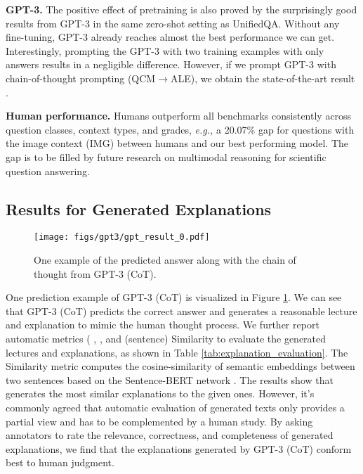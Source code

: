  \textbf{GPT-3.} The positive effect of pretraining is also proved by the surprisingly good results from GPT-3 in the same zero-shot setting as UnifiedQA. Without any fine-tuning, GPT-3 already reaches almost the best performance we can get. Interestingly, prompting the GPT-3 with two training examples with only answers results in a negligible difference. However, if we prompt GPT-3 with chain-of-thought prompting (QCM$\rightarrow$ALE), we obtain the state-of-the-art result .

\textbf{Human performance.} Humans outperform all benchmarks consistently across question classes, context types, and grades, \textit{e.g.,} a 20.07\% gap for questions with the image context (IMG) between humans and our best performing model. The gap is to be filled by future research on multimodal reasoning for scientific question answering.
 
 
\subsection{Results for Generated Explanations}

\begin{figure}[t!]
 \centering
\texttt{[image: figs/gpt3/gpt\_result\_0.pdf]}
 \caption{One example of the predicted answer along with the chain of thought from GPT-3 (CoT).}
 \label{fig:gpt3_result}
\end{figure}

One prediction example of GPT-3 (CoT) is visualized in Figure \ref{fig:gpt3_result}. We can see that GPT-3 (CoT) predicts the correct answer and generates a reasonable lecture and explanation to mimic the human thought process.
We further report automatic metrics ( \cite{papineni2002bleu},  \cite{papineni2002bleu}, and (sentence) Similarity \cite{reimers-2019-sentence-bert} to evaluate the generated lectures and explanations, as shown in Table \ref{tab:explanation_evaluation}. The  Similarity metric computes the cosine-similarity of semantic embeddings  between two sentences based on the Sentence-BERT network \cite{reimers-2019-sentence-bert}.
The results show that  generates the most similar explanations to the given ones. However, it's commonly agreed that automatic evaluation of generated texts only provides a partial view and has to be complemented by a human study. By asking annotators to rate the relevance, correctness, and completeness of generated explanations, we find that the explanations generated by GPT-3 (CoT) conform best to human judgment.




